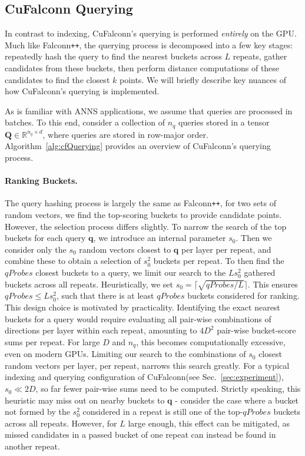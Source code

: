 \documentclass{article}
\newcommand{\Real}{\mathbb{R}}
\newcommand{\bQ}{\mathbf{Q}}
\newcommand{\bq}{\mathbf{q}}
\newcommand{\qp}{qProbes\xspace}
\newcommand{\sz}{s_0}
\newcommand{\cf}{CuFalconn\xspace}
\newcommand{\fpp}{Falconn\texttt{++}\xspace}
\begin{document}
\subsection{\cf Querying}

In contrast to indexing, CuFalconn's querying is performed \emph{entirely} on the GPU. Much like \fpp, the querying process is decomposed into a few key stages: repeatedly hash the query to find the nearest buckets across $L$ repeats, gather candidates from these buckets, then perform distance computations of these candidates to find the closest $k$ points. We will briefly describe key nuances of how \cf's querying is implemented.

As is familiar with ANNS applications, we assume that queries are processed in batches. To this end, consider a collection of $n_q$ queries stored in a tensor $\bQ \in \Real^{n_q \times d}$, where queries are stored in row-major order. Algorithm~\ref{alg:cfQuerying} provides an overview of CuFalconn's querying process.

\paragraph{Ranking Buckets.} The query hashing process is largely the same as \fpp, for two sets of random vectors, we find the top-scoring buckets to provide candidate points. However, the selection process differs slightly. To narrow the search of the top buckets for 
each query $\bq$, we introduce an internal parameter $\sz$. Then we consider only the $\sz$ random vectors closest to $\bq$ per layer per repeat, and combine these to obtain a selection of $\sz^2$ buckets per repeat. To then find the $\qp$ closest buckets to a query, we limit our search to the $L \sz^2$ gathered buckets across all repeats. Heuristically, we set $\sz = \lceil \sqrt{\qp / L} \rceil$. This ensures $qProbes \leq L \sz^2$, such that there is at least $\qp$ buckets considered for ranking. This design choice is motivated by practicality. Identifying the exact nearest buckets for a query would require evaluating all pair-wise combinations of directions per layer within each repeat, amounting to $4D^2$ pair-wise bucket-score sums per repeat. For large $D$ and $n_q$, this becomes computationally excessive, even on modern GPUs. Limiting our search to the combinations of $\sz$ closest random vectors per layer, per repeat, narrows this search greatly. For a typical indexing and querying configuration of \cf (see Sec.~\ref{sec:experiment}), $\sz \ll 2D$, so far fewer pair-wise sums need to be computed. Strictly speaking, this heuristic may miss out on nearby buckets to $\bq$ - consider the case where a bucket not formed by the $\sz^2$ considered in a repeat is still one of the top-$qProbes$ buckets across all repeats. However, for $L$ large enough, this effect can be mitigated, as missed candidates in a passed bucket of one repeat can instead be found in another repeat. 
\end{document}
